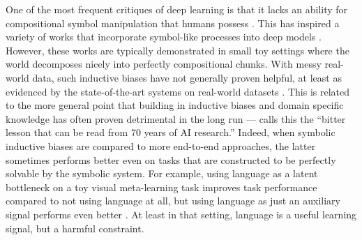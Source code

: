 One of the most frequent critiques of deep learning is that it lacks an ability for compositional symbol manipulation that humans possess \citep[e.g.][see also above]{Fodor1988, Lake2016,Lake2017,Marcus2018}. This has inspired a variety of works that incorporate symbol-like processes into deep models \citep[e.g.][]{Mao2019}. However, these works are typically demonstrated in small toy settings where the world decomposes nicely into perfectly compositional chunks. With messy real-world data, such inductive biases have not generally proven helpful, at least as evidenced by the state-of-the-art systems on real-world datasets \citep[e.g.][]{Radford2019,Raffel2019}. This is related to the more general point that building in inductive biases and domain specific knowledge has often proven detrimental in the long run --- \citet{Sutton2019} calls this the ``bitter lesson that can be read from 70 years of AI research.'' Indeed, when symbolic inductive biases are compared to more end-to-end approaches, the latter sometimes performs better even on tasks that are constructed to be perfectly solvable by the symbolic system. For example, using language as a latent bottleneck on a toy visual meta-learning task improves task performance compared to not using language at all, but using language as just an auxiliary signal performs even better \citep{Mu2019}. At least in that setting, language is a useful learning signal, but a harmful constraint. \par  
